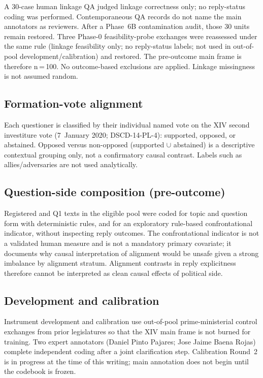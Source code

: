 A 30-case human linkage QA judged linkage correctness only; no reply-status
coding was performed. Contemporaneous QA records do not name the main
annotators as reviewers. After a Phase~6B contamination audit, those 30 units
remain restored. Three Phase-0 feasibility-probe exchanges were reassessed
under the same rule (linkage feasibility only; no reply-status labels; not
used in out-of-pool development/calibration) and restored. The pre-outcome
main frame is therefore n\,=\,100. No outcome-based exclusions are applied.
Linkage missingness is not assumed random.

\subsection{Formation-vote alignment}

Each questioner is classified by their individual named vote on the XIV second
investiture vote (7~January 2020; DSCD-14-PL-4): supported, opposed, or
abstained. Opposed versus non-opposed (supported $\cup$ abstained) is a
descriptive contextual grouping only, not a confirmatory causal contrast.
Labels such as allies/adversaries are not used analytically.

\subsection{Question-side composition (pre-outcome)}

Registered and Q1 texts in the eligible pool were coded for topic and question
form with deterministic rules, and for an exploratory rule-based
confrontational indicator, without inspecting reply outcomes. The
confrontational indicator is not a validated human measure and is not a
mandatory primary covariate; it documents why causal interpretation of
alignment would be unsafe given a strong imbalance by alignment stratum.
Alignment contrasts in reply explicitness therefore cannot be interpreted as
clean causal effects of political side.

\subsection{Development and calibration}

Instrument development and calibration use out-of-pool prime-ministerial
control exchanges from prior legislatures so that the XIV main frame is not
burned for training. Two expert annotators (Daniel Pinto Pajares; Jose Jaime
Baena Rojas) complete independent coding after a joint clarification step.
Calibration Round~2 is in progress at the time of this writing; main
annotation does not begin until the codebook is frozen.

